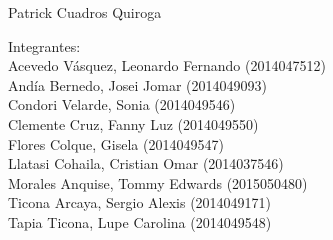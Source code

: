 \documentclass[12pt,letterpaper]{article}
\begin{document}
\begin{titlepage}
\begin{center}
\vspace*{0.1in}
\begin{large}
 Patrick Cuadros Quiroga\\
\end{large}

\vspace*{0.2in}
\vspace*{0.1in}
\begin{large}
\begin{flushleft}
Integrantes: \\
Acevedo Vásquez, Leonardo Fernando 	\hfill(2014047512) \\
Andía Bernedo, Josei Jomar 			\hfill(2014049093) \\
Condori Velarde, Sonia          	\hfill(2014049546) \\
Clemente Cruz, Fanny Luz    		\hfill(2014049550) \\
Flores Colque, Gisela           	\hfill(2014049547) \\
Llatasi Cohaila, Cristian Omar		\hfill(2014037546) \\
Morales Anquise, Tommy Edwards 		\hfill(2015050480) \\
Ticona Arcaya, Sergio Alexis		\hfill(2014049171) \\
Tapia Ticona, Lupe Carolina			\hfill(2014049548) \\
\end{flushleft}


\end{large}
\end{center}

\end{titlepage}




\tableofcontents
\thispagestyle{empty}
\newpage
\setcounter{page}{1}

 
\end{document}
